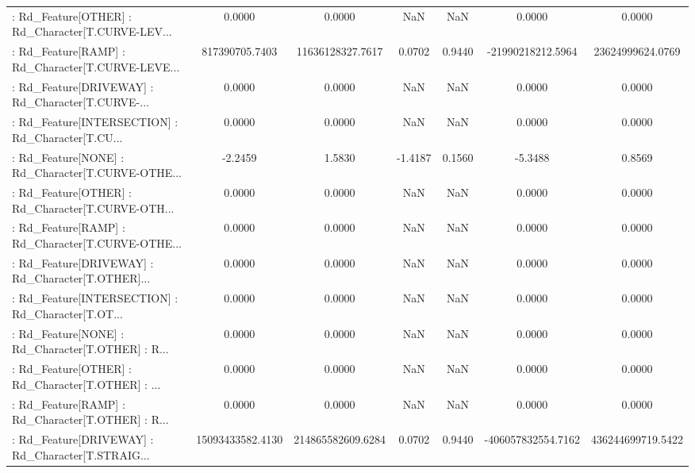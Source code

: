 \begin{longtable}{p{4cm}cccccc}
 : Rd\_Feature[OTHER] : Rd\_Character[T.CURVE-LEV... &            0.0000 &            0.0000 &     NaN &          NaN &             0.0000 &            0.0000 \\
 : Rd\_Feature[RAMP] : Rd\_Character[T.CURVE-LEVE... &    817390705.7403 &  11636128327.7617 &  0.0702 &       0.9440 &  -21990218212.5964 &  23624999624.0769 \\
 : Rd\_Feature[DRIVEWAY] : Rd\_Character[T.CURVE-... &            0.0000 &            0.0000 &     NaN &          NaN &             0.0000 &            0.0000 \\
 : Rd\_Feature[INTERSECTION] : Rd\_Character[T.CU... &            0.0000 &            0.0000 &     NaN &          NaN &             0.0000 &            0.0000 \\
 : Rd\_Feature[NONE] : Rd\_Character[T.CURVE-OTHE... &           -2.2459 &            1.5830 & -1.4187 &       0.1560 &            -5.3488 &            0.8569 \\
 : Rd\_Feature[OTHER] : Rd\_Character[T.CURVE-OTH... &            0.0000 &            0.0000 &     NaN &          NaN &             0.0000 &            0.0000 \\
 : Rd\_Feature[RAMP] : Rd\_Character[T.CURVE-OTHE... &            0.0000 &            0.0000 &     NaN &          NaN &             0.0000 &            0.0000 \\
 : Rd\_Feature[DRIVEWAY] : Rd\_Character[T.OTHER]... &            0.0000 &            0.0000 &     NaN &          NaN &             0.0000 &            0.0000 \\
 : Rd\_Feature[INTERSECTION] : Rd\_Character[T.OT... &            0.0000 &            0.0000 &     NaN &          NaN &             0.0000 &            0.0000 \\
 : Rd\_Feature[NONE] : Rd\_Character[T.OTHER] : R... &            0.0000 &            0.0000 &     NaN &          NaN &             0.0000 &            0.0000 \\
 : Rd\_Feature[OTHER] : Rd\_Character[T.OTHER] : ... &            0.0000 &            0.0000 &     NaN &          NaN &             0.0000 &            0.0000 \\
 : Rd\_Feature[RAMP] : Rd\_Character[T.OTHER] : R... &            0.0000 &            0.0000 &     NaN &          NaN &             0.0000 &            0.0000 \\
 : Rd\_Feature[DRIVEWAY] : Rd\_Character[T.STRAIG... &  15093433582.4130 & 214865582609.6284 &  0.0702 &       0.9440 & -406057832554.7162 & 436244699719.5422 \\

\end{longtable}
